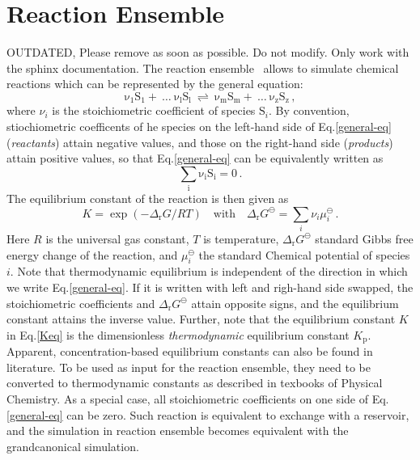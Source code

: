 \section{Reaction Ensemble}
OUTDATED, Please remove as soon as possible. Do not modify. Only work with the sphinx documentation.
The reaction ensemble~\cite{smith94a} allows to simulate chemical reactions which can be represented by the general equation:
\begin{equation}
	\mathrm{\nu_1 S_1 +\ \dots\  \nu_l S_l\ \rightleftharpoons\ \nu_m S_m +\ \dots\ \nu_z S_z } \,,
	\label{general-eq}
\end{equation}
where $\nu_i$ is the stoichiometric coefficient of species $\mathrm{S}_i$.  By
convention, stiochiometric coefficents of he species on the left-hand side of
Eq.\ref{general-eq} (\emph{reactants}) attain negative values, and those on the
right-hand side (\emph{products}) attain positive values, so that
Eq.\ref{general-eq} can be equivalently written as
\begin{equation}
	\mathrm{\sum_i \nu_i S_i = 0} \,.
	\label{general-eq-sum}
\end{equation}
The equilibrium constant of the reaction is then given as
\begin{equation}
	K = \exp(-\Delta_{\mathrm{r}}G / RT)
	\quad\text{with}\quad
	\Delta_{\mathrm{r}}G^{\ominus} = \sum_i \nu_i \mu_i^{\ominus}\,.
	\label{Keq}
\end{equation}
Here $R$ is the universal gas constant, $T$ is temperature,
$\Delta_{\mathrm{r}}G^{\ominus}$ standard Gibbs free energy change of the
reaction, and $\mu_i^{\ominus}$ the standard Chemical potential of species $i$.
Note that thermodynamic equilibrium is independent of the direction in which we
write Eq.\ref{general-eq}.  If it is written with left and righ-hand side
swapped, the stoichiometric coefficients and $\Delta_{\mathrm{r}}G^{\ominus}$
attain opposite signs, and the equilibrium constant attains the inverse value.
Further, note that the equilibrium constant $K$ in Eq.\ref{Keq} is the dimensionless
\emph{thermodynamic} equilibrium constant $K_\mathrm{p}$.  Apparent,
concentration-based equilibrium constants can also be found in literature.  To
be used as input for the reaction ensemble, they need to be converted to
thermodynamic constants as described in texbooks of Physical Chemistry.
As a special case, all stoichiometric coefficients on one side
of Eq.\ref{general-eq} can be zero. Such reaction is equivalent
to exchange with a reservoir, and the simulation in reaction ensemble becomes equivalent
with the grandcanonical simulation.

